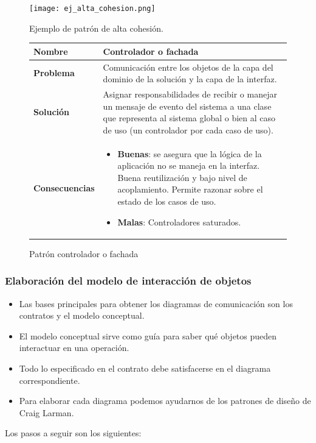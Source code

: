 \documentclass[12pt,spanish]{article}
\begin{document}
\begin{figure}[H]
\centering
\texttt{[image: ej\_alta\_cohesion.png]}
\caption{Ejemplo de patrón de alta cohesión.}
\end{figure}

\begin{figure}[H]
\centering
\begin{tabular}{|m{5cm}|m{8cm}|}
\hline
\textbf{Nombre} & Controlador o fachada\\
\hline
\textbf{Problema} & Comunicación entre los objetos de la capa del dominio de la solución y la capa de la interfaz.\\
\hline
\textbf{Solución} & Asignar responsabilidades de recibir o manejar un mensaje de evento del sistema a una clase que representa al sistema global o bien al caso de uso (un controlador por cada caso de uso).\\
\hline
\textbf{Consecuencias} & 
\begin{itemize}
	\item \textbf{Buenas}: se asegura que la lógica de la aplicación no se maneja en la interfaz. Buena reutilización y bajo nivel de acoplamiento. Permite razonar sobre el estado de los casos de uso.
	\item \textbf{Malas}: Controladores saturados.
\end{itemize}\\
\hline
\end{tabular}
\caption{Patrón controlador o fachada}
\end{figure}

\newpage
\subsubsection{Elaboración del modelo de interacción de objetos}

\begin{itemize}
	\item Las bases principales para obtener los diagramas de comunicación son los contratos y el modelo conceptual.
	\item El modelo conceptual sirve como guía para saber qué objetos pueden interactuar en una operación.
	\item Todo lo especificado en el contrato debe satisfacerse en el diagrama correspondiente.
	\item Para elaborar cada diagrama podemos ayudarnos de los patrones de diseño de Craig Larman.
\end{itemize}

Los pasos a seguir son los siguientes:
\end{document}
